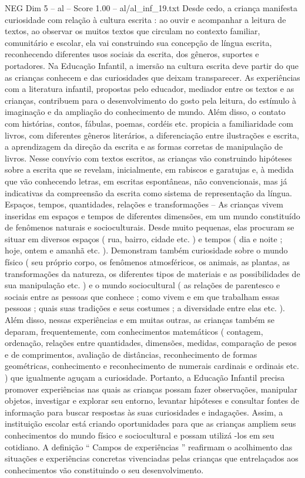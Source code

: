 \begin{textsample}{NEG Dim 5 – al – Score 1.00 – al/al\_inf\_19.txt}
Desde cedo, a criança manifesta curiosidade com relação à cultura escrita : ao ouvir e acompanhar a leitura de textos, ao observar os muitos textos que circulam no contexto familiar, comunitário e escolar, ela vai construindo sua concepção de língua escrita, reconhecendo diferentes usos sociais da escrita, dos gêneros, suportes e portadores.
Na Educação Infantil, a imersão na cultura escrita deve partir do que as crianças conhecem e das curiosidades que deixam transparecer.
As experiências com a literatura infantil, propostas pelo educador, mediador entre os textos e as crianças, contribuem para o desenvolvimento do gosto pela leitura, do estímulo à imaginação e da ampliação do conhecimento de mundo.
Além disso, o contato com histórias, contos, fábulas, poemas, cordéis etc. propicia a familiaridade com livros, com diferentes gêneros literários, a diferenciação entre ilustrações e escrita, a aprendizagem da direção da escrita e as formas corretas de manipulação de livros.
Nesse convívio com textos escritos, as crianças vão construindo hipóteses sobre a escrita que se revelam, inicialmente, em rabiscos e garatujas e, à medida que vão conhecendo letras, em escritas espontâneas, não convencionais, mas já indicativas da compreensão da escrita como sistema de representação da língua.
Espaços, tempos, quantidades, relações e transformações – As crianças vivem inseridas em espaços e tempos de diferentes dimensões, em um mundo constituído de fenômenos naturais e socioculturais.
Desde muito pequenas, elas procuram se situar em diversos espaços ( rua, bairro, cidade etc. ) e tempos ( dia e noite ; hoje, ontem e amanhã etc. ).
Demonstram também curiosidade sobre o mundo físico ( seu próprio corpo, os fenômenos atmosféricos, os animais, as plantas, as transformações da natureza, os diferentes tipos de materiais e as possibilidades de sua manipulação etc. ) e o mundo sociocultural ( as relações de parentesco e sociais entre as pessoas que conhece ; como vivem e em que trabalham essas pessoas ; quais suas tradições e seus costumes ; a diversidade entre elas etc. ).
Além disso, nessas experiências e em muitas outras, as crianças também se deparam, frequentemente, com conhecimentos matemáticos ( contagem, ordenação, relações entre quantidades, dimensões, medidas, comparação de pesos e de comprimentos, avaliação de distâncias, reconhecimento de formas geométricas, conhecimento e reconhecimento de numerais cardinais e ordinais etc. ) que igualmente aguçam a curiosidade.
Portanto, a Educação Infantil precisa promover experiências nas quais as crianças possam fazer observações, manipular objetos, investigar e explorar seu entorno, levantar hipóteses e consultar fontes de informação para buscar respostas às suas curiosidades e indagações.
Assim, a instituição escolar está criando oportunidades para que as crianças ampliem seus conhecimentos do mundo físico e sociocultural e possam utilizá -los em seu cotidiano.
A definição “ Campos de experiências ” reafirmam o acolhimento das situações e experiências concretas vivenciadas pelas crianças que entrelaçados aos conhecimentos vão constituindo o seu desenvolvimento.

\end{textsample}
